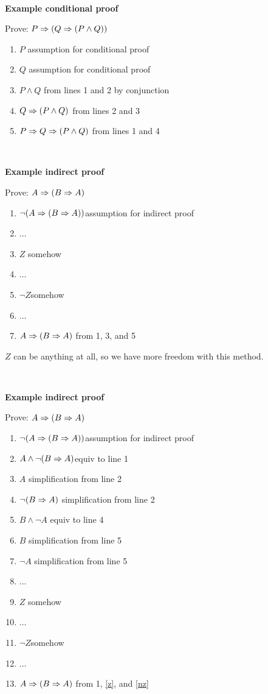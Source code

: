 \documentclass{article}
\newcommand{\ti}[1]{
\mbox{~}

\vspace{1.25in}
\centerline{\bf #1}}
\begin{document}
\newpage
\ti{Example conditional proof}
Prove: $P\Rightarrow (Q\Rightarrow(P\land Q))$

\begin{enumerate}
\item \ind $P$ \hfill assumption for conditional proof
\item \ind \ind $Q$ \hfill assumption for conditional proof
\item \ind \ind $P\land Q$ \hfill from lines 1 and 2 by conjunction
\item \ind $Q\Rightarrow(P\land Q)$ \hfill from lines 2 and 3
\item $P\Rightarrow Q\Rightarrow(P\land Q)$ \hfill from lines 1 and 4
\end{enumerate}


\newpage
\ti{Example indirect proof}
Prove: $A\Rightarrow (B\Rightarrow A)$

\begin{enumerate}
\item \ind$\neg(A\Rightarrow (B\Rightarrow A))$\hfill assumption for indirect proof
\item \ind...
\item \ind$Z$ \hfill somehow
\item \ind...
\item \ind$\neg Z$\hfill somehow 
\item \ind...
\item $A\Rightarrow (B\Rightarrow A)$ \hfill from 1, 3, and 5
\end{enumerate}

\bigskip

$Z$ can be anything at all, so we have more freedom with this method.

\newpage
\ti{Example indirect proof}
Prove: $A\Rightarrow (B\Rightarrow A)$

\begin{enumerate}
\item \ind$\neg(A\Rightarrow (B\Rightarrow A))$\hfill assumption for indirect proof
\item \ind $A \land \neg (B\Rightarrow A)$\hfill equiv to line 1
\item \ind $A$ \hfill simplification from line 2
\item \ind $\neg (B\Rightarrow A)$ \hfill  simplification from line 2
\item \ind $B\land \neg A$ \hfill equiv to line 4
\item \ind $B$ \hfill simplification from line 5
\item \ind $\neg A$ \hfill simplification from line 5
\item \ind...
\item \label{z}\ind$Z$ \hfill somehow
\item \ind...
\item \label{nz}\ind$\neg Z$\hfill somehow 
\item \ind...
\item $A\Rightarrow (B\Rightarrow A)$ \hfill from 1, \ref{z}, and \ref{nz}
\end{enumerate}
\end{document}

